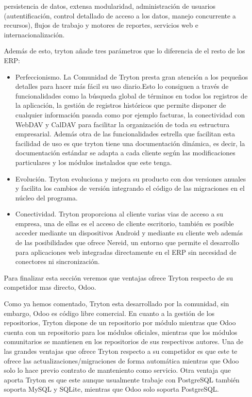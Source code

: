 \documentclass{article}
\begin{document}
persistencia de datos, extensa modularidad, administración de usuarios (autentificación, control detallado de acceso a los datos, manejo concurrente a recursos), flujos de trabajo y motores de reportes, servicios web e internacionalización.

Además de esto, tryton añade tres parámetros que lo diferencia de el resto de  los ERP:

\begin{itemize}
    \item Perfeccionismo. La Comunidad de Tryton presta gran atención a los pequeños detalles para hacer más fácil su uso 	diario.Esto lo consiguen a través de funcionalidades como la búsqueda global de términos en todos los registros de la aplicación, la gestión de registros históricos que permite disponer de cualquier información pasada como por ejemplo facturas, la conectividad con WebDAV y CalDAV para facilitar la organización de toda su estructura empresarial. Además otra de las funcionalidades estrella que facilitan esta facilidad de uso es que tryton tiene una documentación dinámica, es decir, la documentación estándar se adapta a cada cliente según las modificaciones particulares y los módulos instalados que este tenga.
    \item Evolución.  Tryton evoluciona y mejora  su producto con dos versiones anuales y facilita los cambios de versión integrando el código de las migraciones en el núcleo del programa.
    \item Conectividad. Tryton proporciona al cliente varias vias de acceso a su empresa, una de ellas es el acceso de cliente escritorio, también es posible acceder mediante un dispositivos Android y mediante su cliente web además de las  posibilidades que ofrece Nereid, un entorno que permite el desarrollo para aplicaciones web integradas directamente en el ERP sin necesidad de conectores ni sincronización.
\end{itemize}

Para finalizar esta sección veremos que ventajas ofrece Tryton respecto de su competidor mas directo, Odoo.

Como ya hemos comentado, Tryton esta desarrollado por la comunidad, sin embargo, Odoo es código libre comercial. 
En cuanto a la gestión de los repositorios, Tryton dispone de un repositorio por módulo mientras que Odoo cuenta con un repositorio para los módulos oficiales, mientras que los módulos comunitarios se mantienen en los repositorios de sus respectivos autores.
Una de las grandes ventajas que ofrece Tryton respecto a su competidor es que este te ofrece las actualizaciones/migraciones de forma automática mientras que Odoo solo lo hace previo contrato de manteniento como servicio.
Otra ventaja que aporta Tryton es que este aunque usualmente trabaje con PostgreSQL también soporta MySQL y SQLite, mientras que Odoo solo soporta PostgreSQL.
\end{document}
